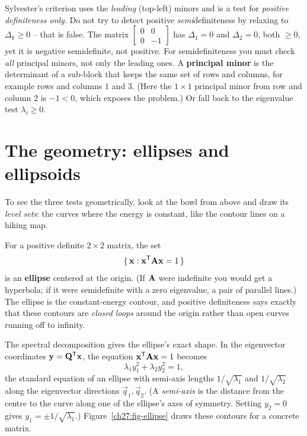 \begin{trapbox}
Sylvester's criterion uses the \emph{leading} (top-left) minors and is a test for \emph{positive
definiteness only}. Do not try to detect positive \emph{semi}definiteness by relaxing to
$\Delta_k \geq 0$ -- that is false. The matrix $\begin{bmatrix} 0 & 0 \\ 0 & -1\end{bmatrix}$ has
$\Delta_1 = 0$ and $\Delta_2 = 0$, both $\geq 0$, yet it is negative semidefinite, not positive. For
semidefiniteness you must check \emph{all} principal minors, not only the leading ones. A
\textbf{principal minor} is the determinant of a sub-block that keeps the same set of rows and
columns, for example rows and columns $1$ and $3$. (Here the $1\times1$ principal minor from row and
column $2$ is $-1 < 0$, which exposes the problem.) Or fall back to the eigenvalue test $\lambda_i
\geq 0$.
\end{trapbox}

\section{The geometry: ellipses and ellipsoids}

To see the three tests geometrically, look at the bowl from above and draw its \emph{level sets}:
the curves where the energy is constant, like the contour lines on a hiking map.

For a positive definite $2\times2$ matrix, the set
\[
  \{\,\mathbf{x} : \mathbf{x}^{\mathsf{T}}\mathbf{A}\mathbf{x} = 1\,\}
\]
is an \textbf{ellipse} centered at the origin. (If $\mathbf{A}$ were indefinite you would get a
hyperbola; if it were semidefinite with a zero eigenvalue, a pair of parallel lines.) The ellipse is
the constant-energy contour, and positive definiteness says exactly that these contours are
\emph{closed loops} around the origin rather than open curves running off to infinity.

The spectral decomposition gives the ellipse's exact shape. In the eigenvector coordinates
$\mathbf{y} = \mathbf{Q}^{\mathsf{T}}\mathbf{x}$, the equation $\mathbf{x}^{\mathsf{T}}\mathbf{A}\mathbf{x}=1$ becomes
\[
  \lambda_1 y_1^2 + \lambda_2 y_2^2 = 1,
\]
the standard equation of an ellipse with semi-axis lengths $1/\sqrt{\lambda_1}$ and
$1/\sqrt{\lambda_2}$ along the eigenvector directions $\vec{q}_1, \vec{q}_2$. (A \emph{semi-axis} is
the distance from the centre to the curve along one of the ellipse's axes of symmetry. Setting
$y_2 = 0$ gives $y_1 = \pm 1/\sqrt{\lambda_1}$.) Figure~\ref{ch27:fig-ellipse} draws these
contours for a concrete matrix.

